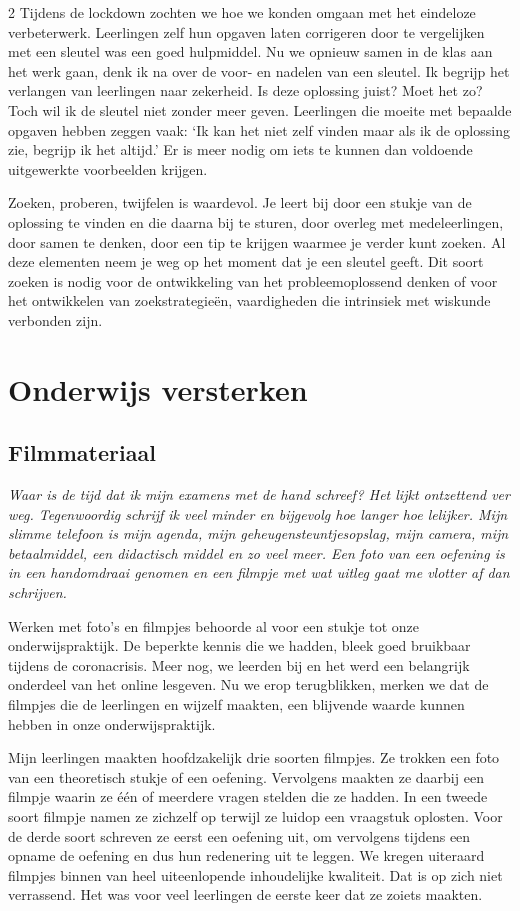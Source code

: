 \begin{multicols}{2}
Tijdens de lockdown zochten we hoe we konden omgaan met het eindeloze verbeterwerk. Leerlingen zelf hun opgaven laten corrigeren door te vergelijken met een sleutel was een goed hulpmiddel. Nu we opnieuw samen in de klas aan het werk gaan, denk ik na over de voor- en nadelen van een sleutel. Ik begrijp het verlangen van leerlingen naar zekerheid. Is deze oplossing juist? Moet het zo? Toch wil ik de sleutel niet zonder meer geven. Leerlingen die moeite met bepaalde opgaven hebben zeggen vaak: `Ik kan het niet zelf vinden maar als ik de oplossing zie, begrijp ik het altijd.' Er is meer nodig om iets te kunnen dan voldoende uitgewerkte voorbeelden krijgen.

Zoeken, proberen, twijfelen is waardevol. Je leert bij door een stukje van de oplossing te vinden en die daarna bij te sturen, door overleg met medeleerlingen, door samen te denken, door een tip te krijgen waarmee je verder kunt zoeken. Al deze elementen neem je weg op het moment dat je een sleutel geeft. Dit soort zoeken is nodig voor de ontwikkeling van het probleemoplossend denken of voor het ontwikkelen van zoekstrategieën, vaardigheden die intrinsiek met wiskunde verbonden zijn. 

\section{Onderwijs versterken}
\subsection{Filmmateriaal} 
\emph{Waar is de tijd dat
ik mijn examens met de hand schreef? Het lijkt ontzettend ver weg. Tegenwoordig schrijf ik veel minder en bijgevolg hoe langer hoe lelijker. Mijn slimme telefoon is mijn agenda, mijn geheugensteuntjesopslag, mijn camera, mijn betaalmiddel, een didactisch middel en zo veel meer. Een foto van een oefening is in een handomdraai genomen en een filmpje met wat uitleg gaat me vlotter af dan schrijven.}

Werken met foto's en filmpjes behoorde al voor een stukje tot onze onderwijspraktijk. De beperkte kennis die we hadden, bleek goed bruikbaar tijdens de coronacrisis. Meer nog, we leerden bij en het werd een belangrijk onderdeel van het online lesgeven. Nu we erop terugblikken, merken we dat de filmpjes die de leerlingen en wijzelf maakten, een blijvende waarde kunnen hebben in onze onderwijspraktijk.

Mijn leerlingen maakten hoofdzakelijk drie soorten filmpjes. Ze trokken een foto van een theoretisch stukje of een oefening.  Vervolgens maakten ze daarbij een filmpje waarin ze één of meerdere vragen stelden die ze hadden. In een tweede soort filmpje namen ze zichzelf op terwijl ze luidop een vraagstuk oplosten. Voor de derde soort schreven ze eerst een oefening uit, om vervolgens tijdens een opname de oefening en dus hun redenering uit te leggen.
We kregen uiteraard filmpjes binnen van heel uiteenlopende inhoudelijke kwaliteit. Dat is op zich niet verrassend. Het was voor veel leerlingen de eerste keer dat ze zoiets maakten. 


\end{multicols}
